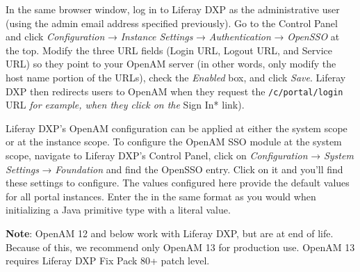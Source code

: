In the same browser window, log in to Liferay DXP as the administrative
user (using the admin email address specified previously). Go to the
Control Panel and click \emph{Configuration} → \emph{Instance Settings}
→ \emph{Authentication} → \emph{OpenSSO} at the top. Modify the three
URL fields (Login URL, Logout URL, and Service URL) so they point to
your OpenAM server (in other words, only modify the host name portion of
the URLs), check the \emph{Enabled} box, and click \emph{Save}. Liferay
DXP then redirects users to OpenAM when they request the
\texttt{/c/portal/login} URL \emph{for example, when they click on the
}Sign In* link).

Liferay DXP's OpenAM configuration can be applied at either the system
scope or at the instance scope. To configure the OpenAM SSO module at
the system scope, navigate to Liferay DXP's Control Panel, click on
\emph{Configuration} → \emph{System Settings} → \emph{Foundation} and
find the OpenSSO entry. Click on it and you'll find these settings to
configure. The values configured here provide the default values for all
portal instances. Enter the in the same format as you would when
initializing a Java primitive type with a literal value.

\noindent\hrulefill

\textbf{Note}: OpenAM 12 and below work with Liferay DXP, but are at end
of life. Because of this, we recommend only OpenAM 13 for production
use. OpenAM 13 requires Liferay DXP Fix Pack 80+ patch level.

\noindent\hrulefill

